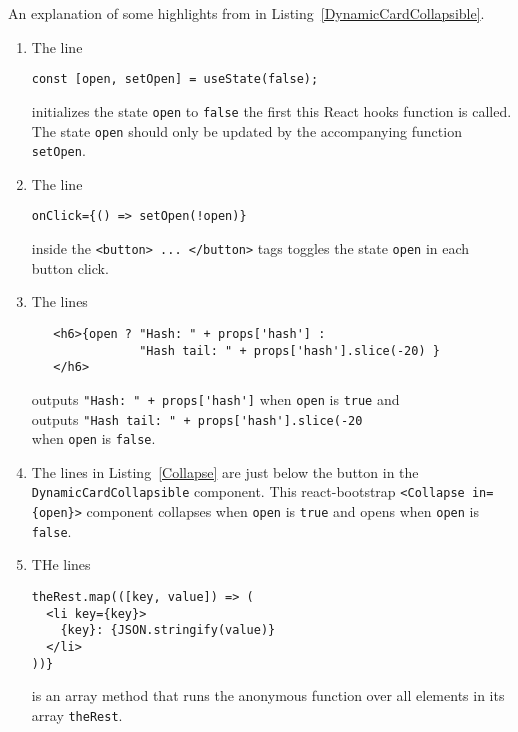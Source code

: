 \documentclass[12pt]{article}
\begin{document}
%
%
\vspace{0.2in}
%
%

An explanation of some highlights from in Listing~\ref{DynamicCardCollapsible}.

\begin{enumerate}

\item

The line 
\begin{lstlisting}
const [open, setOpen] = useState(false);
\end{lstlisting}
initializes the state \lstinline|open| to \lstinline|false| the first this React hooks function is called.
The state \lstinline|open| should only be updated by the accompanying function \lstinline|setOpen|.


\item 
The line 
\begin{lstlisting}
onClick={() => setOpen(!open)}
\end{lstlisting}
inside the \lstinline|<button> ... </button>| tags toggles the state \lstinline|open| in each button click.


\item
The lines 
\begin{lstlisting}
   <h6>{open ? "Hash: " + props['hash'] :  
               "Hash tail: " + props['hash'].slice(-20) }
   </h6>
\end{lstlisting}
outputs \lstinline|"Hash: " + props['hash']| when \lstinline|open| is \lstinline|true| and\\
outputs  \lstinline|"Hash tail: " + props['hash'].slice(-20|\\ when \lstinline|open| is \lstinline|false|.


\item
The lines in Listing~\ref{Collapse} are just below the button in the \lstinline|DynamicCardCollapsible| component.
This react-bootstrap \lstinline|<Collapse in={open}>| component collapses when \lstinline|open| is \lstinline|true| and
opens when \lstinline|open| is \lstinline|false|.

\item
THe lines
\begin{lstlisting}
theRest.map(([key, value]) => (
  <li key={key}>
    {key}: {JSON.stringify(value)}
  </li>
))}
\end{lstlisting}
is an array method that runs the anonymous function over all elements in its array \lstinline|theRest|.

\end{enumerate}
\end{document}

